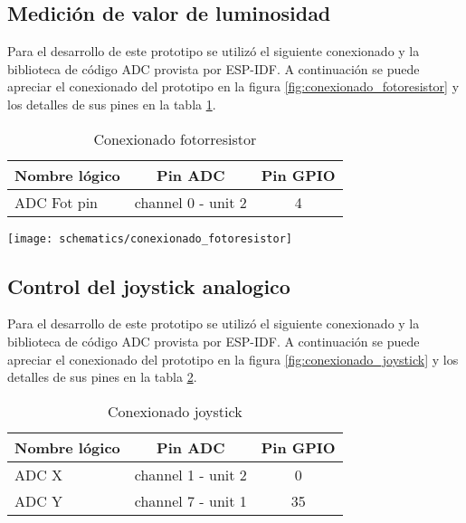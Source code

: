 \subsection{Medición de valor de luminosidad}
Para el desarrollo de este prototipo se utilizó el siguiente conexionado y la biblioteca de código ADC provista por ESP-IDF. A continuación se puede apreciar el conexionado del prototipo en la figura \ref{fig:conexionado_fotoresistor} y los detalles de sus pines en la tabla \ref{tab:conexionado_fotoresistor}.

\vspace{0.5cm}    
\begin{table}[h]
\centering
\caption[Conexionado fotorresistor]{Conexionado fotorresistor}
\begin{tabular}{l c c}
\toprule
\textbf{Nombre lógico} & \textbf{Pin ADC} & \textbf{Pin GPIO}\\
\midrule
ADC Fot pin & channel 0 - unit 2 & 4\\
\bottomrule
\hline
\end{tabular}
\label{tab:conexionado_fotoresistor}
\end{table}


\vspace{0.5cm}
\begin{center}
  \texttt{[image: schematics/conexionado\_fotoresistor]}
    \label{fig:conexionado_fotoresistor}
    
\end{center}

\subsection{Control del joystick analogico}
Para el desarrollo de este prototipo se utilizó el siguiente conexionado y la biblioteca de código ADC provista por ESP-IDF. A continuación se puede apreciar el conexionado del prototipo en la figura \ref{fig:conexionado_joystick} y los detalles de sus pines en la tabla \ref{tab:conexionado_joystick}.


\vspace{0.5cm}
\begin{table}[h]
\centering
\caption[Conexionado joystick]{Conexionado joystick}
\begin{tabular}{l c c}
\toprule
\textbf{Nombre lógico} & \textbf{Pin ADC} & \textbf{Pin GPIO}\\
\midrule
ADC X & channel 1 - unit 2 & 0 \\
ADC Y & channel 7 - unit 1 & 35 \\
\bottomrule
\hline
\end{tabular}
\label{tab:conexionado_joystick}
\end{table}

